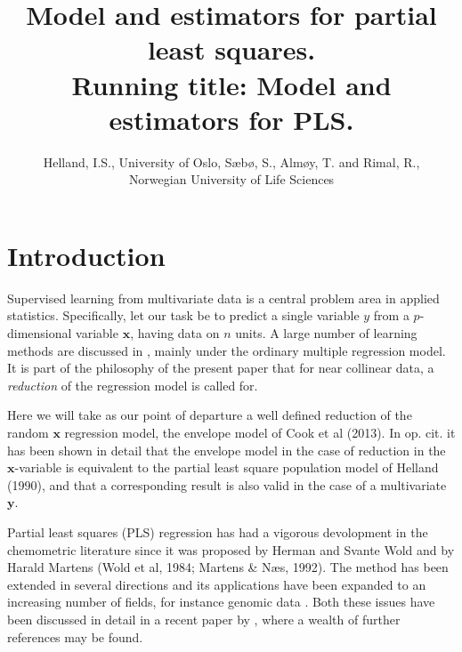 \documentclass[a4paper, 11pt]{article}
\begin{document}
\title{Model and estimators for partial least squares.\\
  Running title: Model and estimators for PLS.}

\author{Helland, I.S., University of Oslo,  S\ae b\o , S., Alm\o y, T.  and Rimal, R.,\\
  Norwegian University of Life Sciences}

\maketitle

\begin{abstract}

\end{abstract}

\setcounter{tocdepth}{1}
\tableofcontents

\onehalfspacing
 
\section{Introduction}

Supervised learning from multivariate data is a central problem area in applied
statistics. Specifically, let our task be to predict a single variable $y$ from
a $p$-dimensional variable $\bm{x}$, having data on $n$ units. A large number of
learning methods are discussed in \citet{hastie2009elements}, mainly under the
ordinary multiple regression model. It is part of the philosophy of the present
paper that for near collinear data, a \emph{reduction} of the regression model
is called for.

Here we will take as our point of departure a well defined reduction of the
random $\bm{x}$ regression model, the envelope model of
\citet{cook2013envelopes} Cook et al (2013). In op. cit. it has been shown in
detail that the envelope model in the case of reduction in the $\bm{x}$-variable
is equivalent to the partial least square population model of
\citet{helland1990partial} Helland (1990), and that a corresponding result is
also valid in the case of a multivariate $\bm{y}$.

Partial least squares (PLS) regression has had a vigorous devolopment in the
chemometric literature since it was proposed by Herman and Svante Wold and by
Harald Martens \citep{wold1984collinearity, martens1992multivariate} (Wold et
al, 1984; Martens \& N\ae s, 1992). The method has been extended in several
directions and its applications have been expanded to an increasing number of
fields, for instance genomic data \citep{boulesteix2007partial}. Both these
issues have been discussed in detail in a recent paper by
\citet{mehmood2016diversity}, where a wealth of further references may be found.
\end{document}
